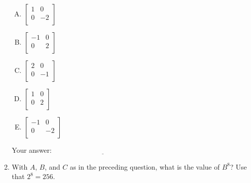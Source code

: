 \documentclass[10pt]{amsart}
\begin{document}
\begin{enumerate}
  \begin{enumerate}[(A)]
  \item $\left[\begin{matrix} 1 & 0 \\ 0 & -2 \\\end{matrix}\right]$
  \item $\left[\begin{matrix} -1 & 0 \\ 0 & 2 \\\end{matrix}\right]$
  \item $\left[\begin{matrix} 2 & 0 \\ 0 & -1 \\\end{matrix}\right]$
  \item $\left[\begin{matrix} 1 & 0 \\ 0 & 2 \\\end{matrix}\right]$
  \item $\left[\begin{matrix} -1 & 0 \\ 0 & -2 \\\end{matrix}\right]$
  \end{enumerate}

  \vspace{0.1in}
  Your answer: $\underline{\qquad\qquad\qquad\qquad\qquad\qquad\qquad}$
  \vspace{0.1in}

\item With $A$, $B$, and $C$ as in the preceding question, what is the
  value of $B^8$? Use that $2^8 = 256$.


\end{enumerate}
\end{document}
